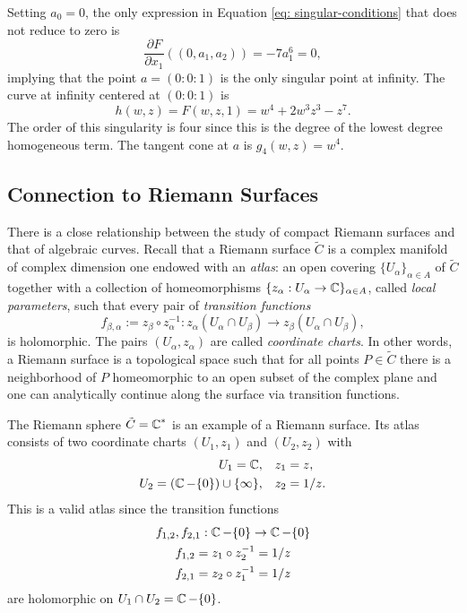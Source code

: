 \begin{example}
Setting $a_0 = 0$, the only expression in Equation \eqref{eq:
  singular-conditions} that does not reduce to zero is
\[
    \frac{\partial F}{\partial x_1}((0,a_1,a_2))
    =
    - 7 a_{1}^{6} = 0,
\]
implying that the point $a = (0 : 0 : 1)$ is the only singular point at
infinity. The curve at infinity centered at $(0 : 0 : 1)$ is
\[
    h(w,z) = F(w,z,1) = w^{4} + 2 w^{3} z^{3} - z^{7}.
\]
The order of this singularity is four since this is the degree of the
lowest degree homogeneous term. The tangent cone at $a$ is $g_4(w,z) =
w^4$.
\end{example}


\subsection{Connection to Riemann Surfaces}

There is a close relationship between the study of compact Riemann
surfaces and that of algebraic curves. Recall that a Riemann surface
$\tilde{C}$ is a complex manifold of complex dimension one endowed with
an {\it atlas}: an open covering $\{U_\alpha \}_{\alpha \in A}$ of
$\tilde{C}$ together with a collection of homeomorphisms $\{z_\alpha :
U_\alpha \to \operatorname{\mathbb{C}}\}_{\alpha \in A}$, called {\it local parameters}, such
that every pair of {\it transition functions}
\[
    f_{\beta,\alpha} := z_\beta \circ z_\alpha^{-1} :
    z_\alpha \left( U_\alpha \cap U_\beta \right)
    \to
    z_\beta \left( U_\alpha \cap U_\beta \right),
\]
is holomorphic. The pairs $(U_\alpha, z_\alpha)$ are called {\it
  coordinate charts}. In other words, a Riemann surface is a topological
space such that for all points $P \in \tilde{C}$ there is a neighborhood
of $P$ homeomorphic to an open subset of the complex plane and one can
analytically continue along the surface via transition functions.

The Riemann sphere $\tilde{C} = \operatorname{\mathbb{C}}^*$ is an example of a Riemann
surface. Its atlas consists of two coordinate charts $(U_1, z_1)$ and
$(U_2, z_2)$ with
\begin{align*}
    U_1 = \operatorname{\mathbb{C}}, & \quad z_1 = z, \\
    U_2 = \left( \operatorname{\mathbb{C}} - \{0\} \right) \cup \{ \infty \}, & \quad z_2 = 1/z.
\end{align*}
This is a valid atlas since the transition functions
\begin{gather*}
    f_{1,2}, f_{2,1} : \operatorname{\mathbb{C}} - \{0\} \to \operatorname{\mathbb{C}} - \{0\} \\
    f_{1,2} = z_1 \circ z_2^{-1} = 1/z \\
    f_{2,1} = z_2 \circ z_1^{-1} = 1/z
\end{gather*}
are holomorphic on $U_1 \cap U_2 = \operatorname{\mathbb{C}} - \{0\}$.


